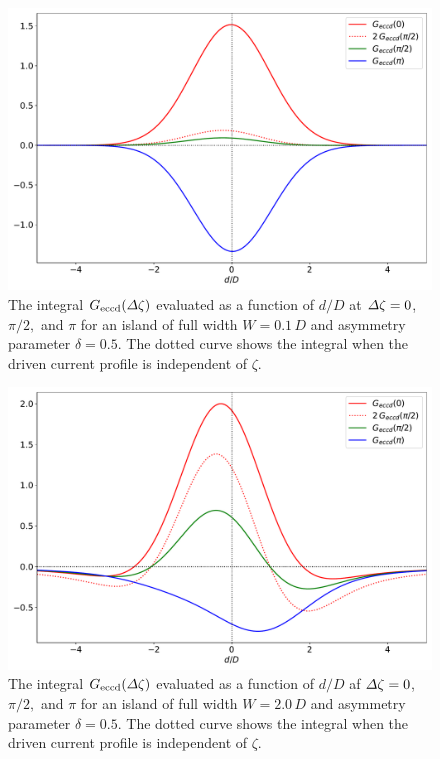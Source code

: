 \documentclass[12pt,prb,aps]{revtex4-1}
\begin{document}
\begin{figure}
\centerline{\includegraphics[width=\textwidth]{Fig9.pdf}}
\caption{The integral $G_{\rm eccd}({\mit\Delta}\zeta)$ evaluated as a function of $d/D$ at ${\mit\Delta}\zeta = 0$, $\pi/2,$ and $\pi$ for an  island
of full width $W=0.1\,D$ and asymmetry parameter $\delta=0.5$. The dotted curve shows the integral when the driven current profile is independent of $\zeta$. \label{fig7}}
\end{figure}

\begin{figure}
\centerline{\includegraphics[width=\textwidth]{Fig10.pdf}}
\caption{The integral $G_{\rm eccd}({\mit\Delta}\zeta)$ evaluated as a function of $d/D$ af ${\mit\Delta}\zeta = 0$, $\pi/2,$ and $\pi$  for an  island
of full width $W=2.0\,D$ and asymmetry parameter $\delta=0.5$. The dotted curve shows the integral when the driven current profile is independent of $\zeta$. \label{fig8}}
\end{figure}
\end{document}
